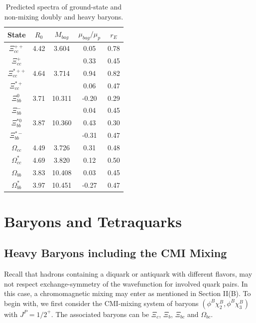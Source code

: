 \documentclass[12pt,onecolumn,floatfix,nofootinbib]{revtex4}
\begin{document}
\renewcommand{\tabcolsep}{0.51cm} \renewcommand{\arraystretch}{1.3}
\begin{table}[!htb]
\caption{Predicted spectra of ground-state and non-mixing doubly and
heavy baryons.}
\label{tab:2heavybaryon}%
\begin{tabular}{ccccc}
\hline\hline
\textrm{State} & $R_{0}$ & $M_{bag}$ & $\mu_{bag}/\mu_{p}$ & $r_{E}$ \\
\hline
$\Xi_{cc}^{++}$ & 4.42 & 3.604 & 0.05 & 0.78 \\
$\Xi_{cc}^{+}$ &  &  & 0.33 & 0.45 \\
$\Xi_{cc}^{\ast ++}$ & 4.64 & 3.714 & 0.94 & 0.82 \\
$\Xi_{cc}^{\ast +}$ &  &  & 0.06 & 0.47 \\
$\Xi_{bb}^{0}$ & 3.71 & 10.311 & -0.20 & 0.29 \\
$\Xi_{bb}^{-}$ &  &  & 0.04 & 0.45 \\
$\Xi_{bb}^{\ast 0}$ & 3.87 & 10.360 & 0.43 & 0.30 \\
$\Xi_{bb}^{\ast -}$ &  &  & -0.31 & 0.47 \\
$\Omega_{cc}$ & 4.49 & 3.726 & 0.31 & 0.48 \\
$\Omega_{cc}^{\ast}$ & 4.69 & 3.820 & 0.12 & 0.50 \\
$\Omega_{bb}$ & 3.83 & 10.408 & 0.03 & 0.45 \\
$\Omega_{bb}^{\ast}$ & 3.97 & 10.451 & -0.27 & 0.47 \\ \hline\hline
\end{tabular}%
\end{table}

\section{Baryons and Tetraquarks}

\label{Hadrons}

\subsection{Heavy Baryons including the CMI Mixing}

Recall that hadrons containing a diquark or antiquark with different
flavors, may not respect exchange-symmetry of the wavefunction for involved
quark pairs. In this case, a chromomagnetic mixing may enter as mentioned in
Section II(B). To begin with, we first consider the CMI-mixing system of
baryons $(\phi ^{B}\chi _{2}^{B},\phi ^{B}\chi _{3}^{B})$ with $J^{P}={1/2}%
^{+}$. The associated baryons can be $\Xi _{c}$, $\Xi _{b}$, $\Xi _{bc}$ and
$\Omega _{bc}$.
\end{document}
